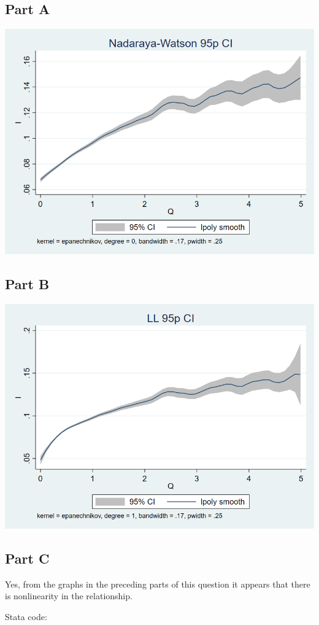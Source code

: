 \documentclass[11pt]{article} %
\begin{document}
\subsection{Part A}
\includegraphics[scale=0.5]{9p1}
\subsection{Part B}
\includegraphics[scale=0.5]{9p2}
\subsection{Part C}
Yes, from the graphs in the preceding parts of this question it appears that there is nonlinearity in the relationship.

Stata code:
\end{document}
